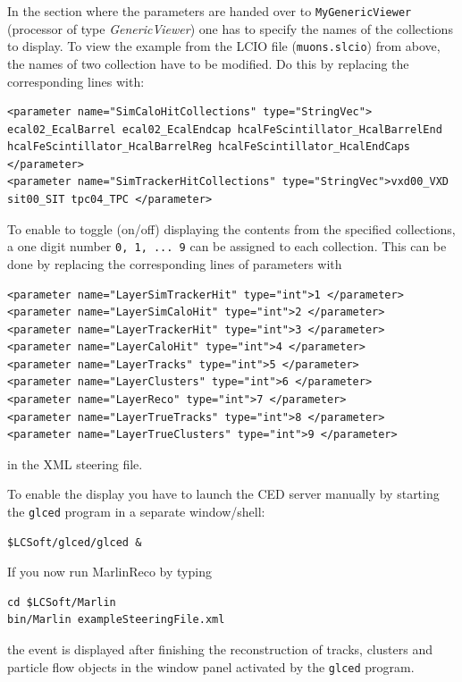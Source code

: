 In the section 
where the parameters are handed over to {\tt MyGenericViewer} 
(processor of type {\em GenericViewer}) one has to specify the 
names of the collections to display. To view the example from the LCIO file 
({\tt muons.slcio}) from above, the names of two collection have to be
modified. Do this by replacing the corresponding lines with:

\begin{verbatim}
<parameter name="SimCaloHitCollections" type="StringVec"> ecal02_EcalBarrel ecal02_EcalEndcap hcalFeScintillator_HcalBarrelEnd hcalFeScintillator_HcalBarrelReg hcalFeScintillator_HcalEndCaps </parameter>
<parameter name="SimTrackerHitCollections" type="StringVec">vxd00_VXD sit00_SIT tpc04_TPC </parameter>
\end{verbatim}

To enable to toggle (on/off) displaying the contents from the 
specified collections, a one digit number {\tt 0, 1, ... 9} can be assigned 
to each collection. This can be done by replacing the corresponding 
lines of parameters with 

\begin{verbatim}
<parameter name="LayerSimTrackerHit" type="int">1 </parameter>
<parameter name="LayerSimCaloHit" type="int">2 </parameter>
<parameter name="LayerTrackerHit" type="int">3 </parameter>
<parameter name="LayerCaloHit" type="int">4 </parameter>
<parameter name="LayerTracks" type="int">5 </parameter>
<parameter name="LayerClusters" type="int">6 </parameter>
<parameter name="LayerReco" type="int">7 </parameter>
<parameter name="LayerTrueTracks" type="int">8 </parameter>
<parameter name="LayerTrueClusters" type="int">9 </parameter>
\end{verbatim}

in the XML steering file.

To enable the display you have to launch the CED server manually
by starting the {\tt glced} program in a separate window/shell:

\begin{verbatim}
$LCSoft/glced/glced &
\end{verbatim}

If you now run MarlinReco by typing

\begin{verbatim}
cd $LCSoft/Marlin
bin/Marlin exampleSteeringFile.xml
\end{verbatim}

the event is displayed after finishing the reconstruction of 
tracks, clusters and particle flow objects in the window panel activated by 
the {\tt glced} program.

